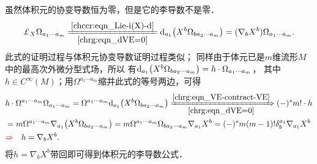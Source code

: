 虽然体积元的协变导数恒为零，但是它的李导数不是零．
\begin{equation}\label{chrg:eqn_LieDVE}
    \Lie_{X} \Omega_{a_1 \cdots a_m}
    \xlongequal[\ref{chrg:eqn_dVE=0}]{\ref{chccr:eqn_Lie-i(X)-d}}
    {\rm d}_{a_1}\bigl(X^b \Omega_{ba_2 \cdots a_m} \bigr)
    = (\nabla_{b}X^b) \Omega_{a_1 \cdots a_m}  .
\end{equation}
此式的证明过程与体积元协变导数证明过程类似；
同样由于体元已是$m$维流形$M$中的最高次外微分型式场，所以
有${\rm d}_{a_1}\bigl(X^b \Omega_{ba_2 \cdots a_m} \bigr) = h\cdot \Omega_{a_1 \cdots a_m}$，
其中$h\in C^\infty(M)$；用$\Omega^{a_1 \cdots a_m}$缩并此式的等号两边，可得
\setlength{\mathindent}{0em}
\begin{align*}
   & h\cdot \Omega^{a_1 \cdots a_m} \Omega_{a_1 \cdots a_m}
   =\Omega^{a_1 \cdots a_m} {\rm d}_{a_1}\bigl(X^b \Omega_{ba_2 \cdots a_m} \bigr)
    \xRightarrow[\ref{chrg:eqn_dVE=0}]{\ref{chrg:eqn_VE-contract-VE}}
    (-)^s m! \cdot h \\
    &=  m \Omega^{a_1 \cdots a_m} \nabla_{a_1}\bigl(X^b \Omega_{ba_2 \cdots a_m} \bigr)
    =m \Omega^{a_1 \cdots a_m} \Omega_{ba_2 \cdots a_m} \nabla_{a_1}X^b
    =(-)^s m (m-1)! \delta_{b}^{a_1} \nabla_{a_1}X^b \\
    &{\color{red}\Rightarrow \quad} h = \nabla_{b}X^b .
\end{align*}\setlength{\mathindent}{2em}
将$h = \nabla_{b}X^b$带回即可得到体积元的李导数公式．


